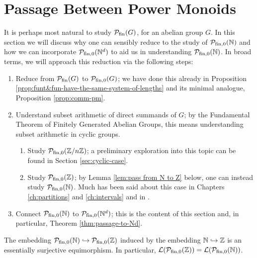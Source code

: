 \section{Passage Between Power Monoids}\label{sec:passage}
It is perhaps most natural to study $\mathcal{P}_{\textrm{fin}}(G)$, for an abelian group $G$. 
In this section we will discuss why one can sensibly reduce to the study of ${\mathcal{P}_{\textrm{fin},0}(\mathbb{N})}$ and how we can incorporate $\mathcal{P}_{\textrm{fin}, 0}(\mathbb{N}^d)$ to aid us in understanding ${\mathcal{P}_{\textrm{fin},0}(\mathbb{N})}$.
In broad terms, we will approach this reduction via the following steps:
\begin{enumerate}[label={\rm (\arabic{*})}]
	\item Reduce from $\mathcal{P}_{\textrm{fin}}(G)$ to $\mathcal{P}_{\textrm{fin}, 0}(G)$; we have done this already in Proposition \ref{prop:funt&fun-have-the-same-system-of-lengths} and its minimal analogue, Proposition \ref{prop:comm-pm}.
	\item Understand subset arithmetic of direct summands of $G$; by the Fundamental Theorem of Finitely Generated Abelian Groups, this means understanding subset arithmetic in cyclic groups.
	\begin{enumerate}[label={\rm (\roman{*})}]
		\item Study $\mathcal{P}_{\textrm{fin}, 0}(\mathbb{Z}/n\mathbb{Z})$; a preliminary exploration into this topic can be found in Section \ref{sec:cyclic-case}.
		\item Study $\mathcal{P}_{\textrm{fin}, 0}(\mathbb{Z})$; by Lemma \ref{lem:pass from N to Z} below, one can instead study ${\mathcal{P}_{\textrm{fin},0}(\mathbb{N})}$.  Much has been said about this case in Chapters \ref{ch:partitions} and \ref{ch:intervals} and in \cite[Section 4]{fan-tringali18}.
	\end{enumerate}
	\item Connect ${\mathcal{P}_{\textrm{fin},0}(\mathbb{N})}$ to $\mathcal{P}_{\textrm{fin}, 0}(\mathbb{N}^d)$; this is the content of this section and, in particular, Theorem \ref{thm:passage-to-Nd}.
\end{enumerate}



\begin{lemma} \label{lem:pass from N to Z}
The embedding ${\mathcal{P}_{\textrm{fin},0}(\mathbb{N})}\hookrightarrow \mathcal{P}_{\textrm{fin}, 0}(\mathbb{Z})$ induced by the embedding $\mathbb{N}\hookrightarrow \mathbb{Z}$ is an essentially surjective equimorphism.
In particular, $\mathcal{L}(\mathcal{P}_{\textrm{fin}, 0}(\mathbb{Z})) = \mathcal{L}({\mathcal{P}_{\textrm{fin},0}(\mathbb{N})})$.
\end{lemma}


